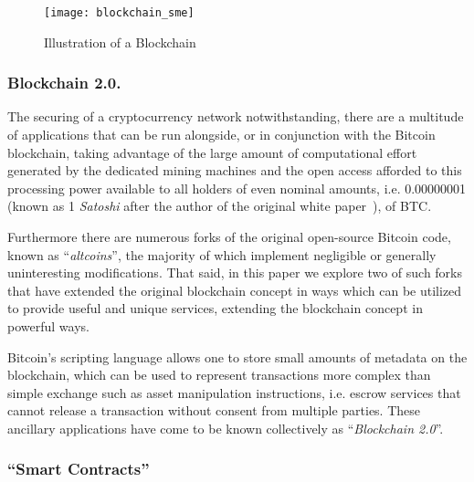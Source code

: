 \begin{figure}[tb]
   \center 
   \texttt{[image: blockchain\_sme]}
   \caption{Illustration of a Blockchain} 
   \label{fig:block-chain-risk}
\end{figure} 
 

\subsubsection{Blockchain 2.0.}

The securing of a cryptocurrency network notwithstanding, there are a multitude of applications that can be run alongside, or in conjunction with the Bitcoin blockchain, taking advantage of the large amount of computational effort generated by the dedicated mining machines and the open access afforded to this processing power available to all holders of even nominal amounts, i.e. 0.00000001 (known as 1 \textit{Satoshi} after the author of the original white paper~\cite{whitepaper}), of BTC. 

Furthermore there are numerous forks of the original open-source Bitcoin code, known as ``\textit{altcoins}'', the majority of which implement negligible or generally uninteresting modifications. That said, in this paper we explore two of such forks that have extended the original blockchain concept in ways which can be utilized to provide useful and unique services, extending the blockchain concept in powerful ways. 

Bitcoin's scripting language allows one to store small amounts of metadata on the blockchain, which can be used to represent transactions more complex than simple exchange such as asset manipulation instructions, i.e. escrow services that cannot release a transaction without consent from multiple parties. 
These ancillary applications have come to be known collectively as ``\textit{Blockchain 2.0}''.

\subsubsection{``Smart Contracts''}


